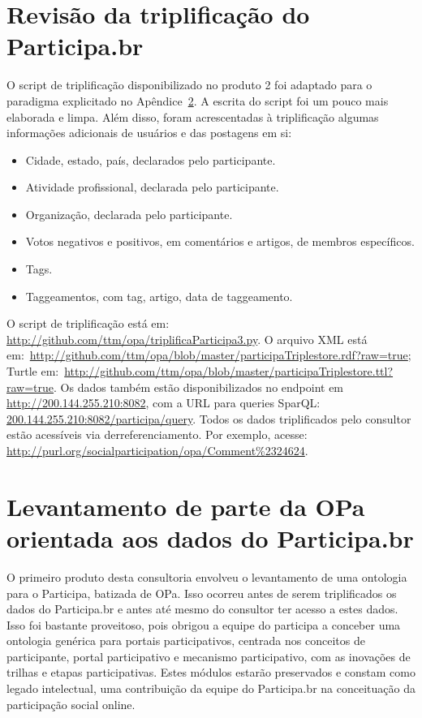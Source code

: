 \documentclass[12pt]{article}
\begin{document}
\section{Revisão da triplificação do Participa.br}
O script de triplificação disponibilizado no produto 2 foi adaptado para o paradigma explicitado no Apêndice~\ref{ap:opa}. A escrita do script foi um pouco mais elaborada e limpa. Além disso,
foram acrescentadas à triplificação algumas informações adicionais de usuários e das postagens em si:
\begin{itemize}
    \item Cidade, estado, país, declarados pelo participante.
    \item Atividade profissional, declarada pelo participante.
    \item Organização, declarada pelo participante.
    \item Votos negativos e positivos, em comentários e artigos, de membros específicos.
    \item Tags.
    \item Taggeamentos, com tag, artigo, data de taggeamento.
\end{itemize}
O script de triplificação está em: \url{http://github.com/ttm/opa/triplificaParticipa3.py}. O arquivo XML está em:~\url{http://github.com/ttm/opa/blob/master/participaTriplestore.rdf?raw=true}; Turtle em:~\url{http://github.com/ttm/opa/blob/master/participaTriplestore.ttl?raw=true}. Os dados também estão disponibilizados no endpoint em \url{http://200.144.255.210:8082}, com a URL para queries SparQL: \url{200.144.255.210:8082/participa/query}. Todos os dados triplificados pelo consultor estão acessíveis via derreferenciamento. Por exemplo, acesse: \url{http://purl.org/socialparticipation/opa/Comment\%2324624}.

\section{Levantamento de parte da OPa orientada aos dados do Participa.br}\label{ap:opa}
O primeiro produto desta consultoria envolveu o levantamento de uma ontologia para o Participa, batizada de OPa. Isso ocorreu antes de serem triplificados os dados do Participa.br e antes até mesmo do consultor ter acesso a estes dados. Isso foi bastante proveitoso, pois obrigou a equipe do participa a conceber uma ontologia genérica para portais participativos, centrada nos conceitos de participante, portal participativo e mecanismo participativo, com as inovações de trilhas e etapas participativas. Estes módulos estarão preservados e constam como legado intelectual, uma contribuição da equipe do Participa.br na conceituação da participação social online.
\end{document}
